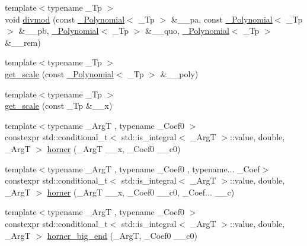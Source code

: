 \begin{DoxyCompactItemize}
\item 
{\footnotesize template$<$typename \+\_\+\+Tp $>$ }\\void \hyperlink{namespace____gnu__cxx_abe506cf34c921c378a681f0de31d49a5}{divmod} (const \hyperlink{class____gnu__cxx_1_1__Polynomial}{\+\_\+\+Polynomial}$<$ \+\_\+\+Tp $>$ \&\+\_\+\+\_\+pa, const \hyperlink{class____gnu__cxx_1_1__Polynomial}{\+\_\+\+Polynomial}$<$ \+\_\+\+Tp $>$ \&\+\_\+\+\_\+pb, \hyperlink{class____gnu__cxx_1_1__Polynomial}{\+\_\+\+Polynomial}$<$ \+\_\+\+Tp $>$ \&\+\_\+\+\_\+quo, \hyperlink{class____gnu__cxx_1_1__Polynomial}{\+\_\+\+Polynomial}$<$ \+\_\+\+Tp $>$ \&\+\_\+\+\_\+rem)
\item 
{\footnotesize template$<$typename \+\_\+\+Tp $>$ }\\\hyperlink{namespace____gnu__cxx_a2af747c0e255f3fae4d9f118c2817e1a}{get\+\_\+scale} (const \hyperlink{class____gnu__cxx_1_1__Polynomial}{\+\_\+\+Polynomial}$<$ \+\_\+\+Tp $>$ \&\+\_\+\+\_\+poly)
\item 
{\footnotesize template$<$typename \+\_\+\+Tp $>$ }\\\hyperlink{namespace____gnu__cxx_a1a8bae104a6509f4e458d155acaf0476}{get\+\_\+scale} (const \+\_\+\+Tp \&\+\_\+\+\_\+x)
\item 
{\footnotesize template$<$typename \+\_\+\+ArgT , typename \+\_\+\+Coef0 $>$ }\\constexpr std\+::conditional\+\_\+t$<$ std\+::is\+\_\+integral$<$ \+\_\+\+ArgT $>$\+::value, double, \+\_\+\+ArgT $>$ \hyperlink{namespace____gnu__cxx_a2e77239e9d41f55a99755f285ba3d518}{horner} (\+\_\+\+ArgT \+\_\+\+\_\+x, \+\_\+\+Coef0 \+\_\+\+\_\+c0)
\item 
{\footnotesize template$<$typename \+\_\+\+ArgT , typename \+\_\+\+Coef0 , typename... \+\_\+\+Coef$>$ }\\constexpr std\+::conditional\+\_\+t$<$ std\+::is\+\_\+integral$<$ \+\_\+\+ArgT $>$\+::value, double, \+\_\+\+ArgT $>$ \hyperlink{namespace____gnu__cxx_a027e4b11b3b25078522220207c2d7f36}{horner} (\+\_\+\+ArgT \+\_\+\+\_\+x, \+\_\+\+Coef0 \+\_\+\+\_\+c0, \+\_\+\+Coef... \+\_\+\+\_\+c)
\item 
{\footnotesize template$<$typename \+\_\+\+ArgT , typename \+\_\+\+Coef0 $>$ }\\constexpr std\+::conditional\+\_\+t$<$ std\+::is\+\_\+integral$<$ \+\_\+\+ArgT $>$\+::value, double, \+\_\+\+ArgT $>$ \hyperlink{namespace____gnu__cxx_af87123557fba351af5069ed8d1b99ec1}{horner\+\_\+big\+\_\+end} (\+\_\+\+ArgT, \+\_\+\+Coef0 \+\_\+\+\_\+c0)
\item 

\end{DoxyCompactItemize}

